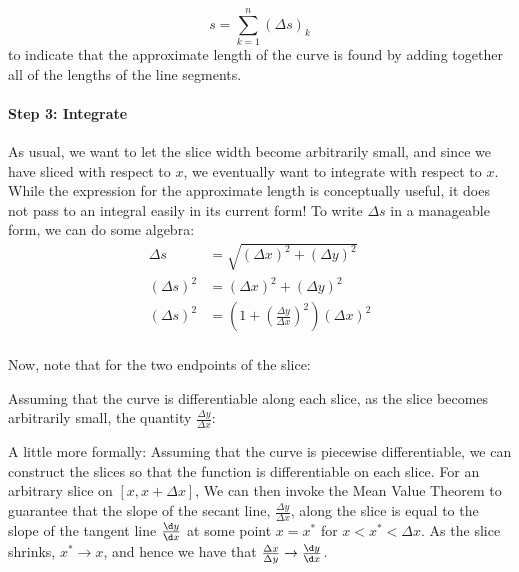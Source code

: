 \documentclass{ximera}
\begin{document}
\begin{model}
\begin{explanation}
\[ 
s = \sum_{k=1}^n (\Delta s)_k
\]
to indicate that the approximate length of the curve is found by adding together all of the lengths of the line segments.

\paragraph{Step 3: Integrate}
As usual, we want to let the slice width become arbitrarily small, and since we have sliced with respect to $x$, we eventually want to integrate with respect to $x$.  While the expression for the approximate length is conceptually useful, it does not pass to an integral easily in its current form!  To write $\Delta s$ in a manageable form, we can do some algebra:
\begin{align*}
	\Delta s  &= \sqrt{(\Delta x)^2+(\Delta y)^2}\\
	\left( \Delta s \right)^2 &= \left( \Delta x \right)^2 + \left( \Delta y \right)^2\\
	\left( \Delta s \right)^2 &= \left( 1 + \left( \frac{\Delta y}{\Delta x} \right)^2 \right) \left( \Delta x\right)^2\\
\end{align*}

Now, note that for the two endpoints of the slice:

\begin{multipleChoice}
\end{multipleChoice}

Assuming that the curve is differentiable along each slice, as the slice becomes arbitrarily small, the quantity $\frac{\Delta y}{\Delta x}$:

\begin{multipleChoice}
\end{multipleChoice}

\begin{remark}
A little more formally: Assuming that the curve is piecewise differentiable, we can construct the slices so that the function is differentiable on each slice.  For an arbitrary slice on $[x, x+\Delta x]$, We can then invoke the Mean Value Theorem to guarantee that the slope of the secant line, $\frac{\Delta y}{\Delta x}$, along the slice is equal to the slope of the tangent line $\frac{\d y}{\d x}$ at some point $x=x^*$ for $x<x^*<\Delta x$.  As the slice shrinks, $x^* \rightarrow x$, and hence we have that $\frac{\Delta x}{\Delta y} \rightarrow \frac{\d y}{\d x}$.
\end{remark}



\end{explanation}
\end{model}
\end{document}
